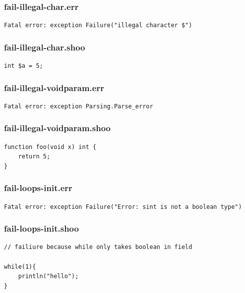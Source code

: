 \documentclass[12pt]{article}
\begin{document}
\subsubsection{fail-illegal-char.err}
\begin{mdframed}[hidealllines=true,backgroundcolor=green!10]
\begin{lstlisting}
Fatal error: exception Failure("illegal character $")
\end{lstlisting}
\end{mdframed}
\subsubsection{fail-illegal-char.shoo}
\begin{mdframed}[hidealllines=true,backgroundcolor=blue!10]
\begin{lstlisting}
int $a = 5;
\end{lstlisting}
\end{mdframed}
\subsubsection{fail-illegal-voidparam.err}
\begin{mdframed}[hidealllines=true,backgroundcolor=green!10]
\begin{lstlisting}
Fatal error: exception Parsing.Parse_error
\end{lstlisting}
\end{mdframed}
\subsubsection{fail-illegal-voidparam.shoo}
\begin{mdframed}[hidealllines=true,backgroundcolor=blue!10]
\begin{lstlisting}
function foo(void x) int {
    return 5;
}\end{lstlisting}
\end{mdframed}
\subsubsection{fail-loops-init.err}
\begin{mdframed}[hidealllines=true,backgroundcolor=green!10]
\begin{lstlisting}
Fatal error: exception Failure("Error: sint is not a boolean type")\end{lstlisting}
\end{mdframed}
\subsubsection{fail-loops-init.shoo}
\begin{mdframed}[hidealllines=true,backgroundcolor=blue!10]
\begin{lstlisting}
// failiure because while only takes boolean in field

while(1){
	println("hello");
}\end{lstlisting}
\end{mdframed}
\end{document}
